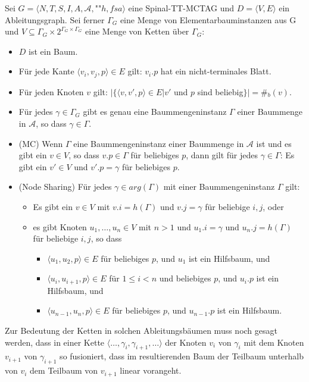 \begin{definition} \label{def-spinal-ablbaum}
Sei $G = \langle N,T,S,I,A,\mathcal{A},$""$h,\mathit{fsa}\rangle$ eine Spinal-TT-MCTAG und $D = \langle  V,E \rangle $ ein Ableitungsgraph. Sei ferner $\Gamma_G$ eine Menge von Elementarbauminstanzen aus G und $V \subseteq \Gamma_G \times 2^{\Gamma_G \times \Gamma_G}$ eine Menge von Ketten über $\Gamma_G$:
\begin{itemize}
  \item $D$ ist ein Baum.
  \item Für jede Kante $\langle v_i, v_j, p \rangle \in E$ gilt: $v_i.p$ hat ein nicht-terminales Blatt. 
  \item Für jeden Knoten $v$ gilt: $|\{ \langle v, v', p \rangle \in E | v'$ und $p$ sind beliebig$ \}| = $\#$_b(v)$.
  \item Für jedes $\gamma \in \Gamma_G$ gibt es genau eine Baummengeninstanz $\Gamma$ einer Baummenge in $\mathcal{A}$, so dass $\gamma \in \Gamma$.
  \item (MC) Wenn $\Gamma$ eine Baummengeninstanz einer Baummenge in $\mathcal{A}$ ist und es gibt ein $v \in V$, so dass $v.p \in \Gamma$ für beliebiges $p$, dann gilt für jedes $\gamma \in \Gamma$: Es gibt ein $v' \in V$ und $v'.p = \gamma$ für beliebiges $p$.
  \item (Node Sharing) Für jedes $\gamma \in arg(\Gamma)$ mit einer Baummengeninstanz $\Gamma$ gilt:
  \begin{itemize}
    \item Es gibt ein $v \in V$ mit $v.i = h(\Gamma)$ und $v.j = \gamma$ für beliebige $i,j$, oder
    \item es gibt Knoten $u_1, \ldots, u_n \in V$ mit $n > 1$ und $u_1.i = \gamma$ und $u_n.j = h(\Gamma)$ für beliebige $i,j$, so dass 
    \begin{itemize}
      \item $\langle u_1, u_2,p \rangle \in E$ für beliebiges $p$, und $u_1$ ist ein Hilfsbaum, und
      \item $\langle u_i,u_{i+1},p \rangle \in E$ für $1 \leq i < n$ und beliebiges $p$, und $u_i.p$ ist ein Hilfsbaum, und 
      \item $\langle u_{n-1},u_n,p \rangle \in E$ für beliebiges $p$, und $u_{n-1}.p$ ist ein Hilfsbaum. 
    \end{itemize}
  \end{itemize}
\end{itemize}

\end{definition}
Zur Bedeutung der Ketten in solchen Ableitungsbäumen muss noch gesagt werden, dass in einer Kette $\langle \ldots, \gamma_i, \gamma_{i+1}, \ldots \rangle$ der Knoten $v_i$ von $\gamma_i$ mit dem Knoten $v_{i+1}$ von $\gamma_{i+1}$ so fusioniert, dass im resultierenden Baum der Teilbaum unterhalb von $v_i$ dem Teilbaum von $v_{i+1}$ linear vorangeht.


